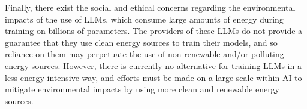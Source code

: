 Finally, there exist the social and ethical concerns regarding the environmental impacts of the use of LLMs, which consume large amounts of energy during training on billions of parameters. The providers of these LLMs do not provide a guarantee that they use clean energy sources to train their models, and so reliance on them may perpetuate the use of non-renewable and/or polluting energy sources. However, there is currently no alternative for training LLMs in a less energy-intensive way, and efforts must be made on a large scale within AI to mitigate environmental impacts by using more clean and renewable energy sources.